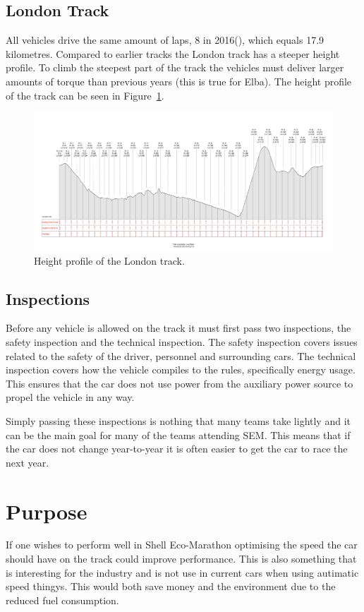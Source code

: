 \subsection{London Track}
All vehicles drive the same amount of laps, 8 in 2016(\cite{semrules16c2}),
which equals 17.9 kilometres. Compared to earlier tracks the London track has a
steeper height profile. To climb the steepest part of the track the vehicles
must deliver larger amounts of torque than previous years (this is true for
Elba). The height profile of the track can be seen in
Figure~\ref{fig:introduction_londontrack}.
\begin{figure}[H]
    \centering
    \includegraphics[width=\textwidth]{./img/introduction_londontrack.png}
    \caption{Height profile of the London
    track.}\label{fig:introduction_londontrack}
\end{figure}

\subsection{Inspections}
Before any vehicle is allowed on the track it must first pass two inspections,
the safety inspection and the technical inspection. The safety inspection covers
issues related to the safety of the driver, personnel and surrounding cars. 
The technical inspection covers how the vehicle compiles to the rules,
specifically energy usage. This ensures that the car does not use power from the
auxiliary power source to propel the vehicle in any way.

Simply passing these inspections is nothing that many teams take lightly and it
can be the main goal for many of the teams attending SEM\@. This means that
if the car does not change year-to-year it is often easier to get the car to
race the next year.

\section{Purpose}
If one wishes to perform well in Shell Eco-Marathon optimising the speed the car should have on the track could improve performance. 
This is also something that is interesting for the industry and is not use in current cars when using autimatic speed thingys. This would both save money and the environment due to the reduced fuel consumption.

